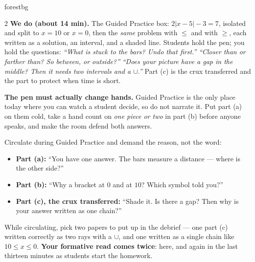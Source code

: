 \documentclass[10pt]{article}
\begin{document}
\begin{skillbox}{forestbg}
\begin{multicols}{2}
\columnbreak
\textbf{We do (about 14 min).} The Guided Practice box: $2|x-5|-3=7$, isolated and split to
$x=10$ or $x=0$, then the \emph{same} problem with $\le$ and with $\ge$, each written as a
solution, an interval, and a shaded line. Students hold the pen; you hold the questions:
\emph{``What is stuck to the bars? Undo that first.''} \quad \emph{``Closer than or farther
than? So between, or outside?''} \quad \emph{``Does your picture have a gap in the middle? Then
it needs two intervals and a $\cup$.''} Part (c) is the crux transferred and the part to protect
when time is short.

\textbf{The pen must actually change hands.} Guided Practice is the only place today where you
can watch a student decide, so do not narrate it. Put part (a) on them cold, take a hand count
on \emph{one piece or two} in part (b) before anyone speaks, and make the room defend both
answers.

Circulate during Guided Practice and demand the reason, not the word:
\begin{itemize}[leftmargin=1.1em, nosep]
  \item \textbf{Part (a):} ``You have one answer. The bars measure a distance --- where is the
        other side?''
  \item \textbf{Part (b):} ``Why a bracket at $0$ and at $10$? Which symbol told you?''
  \item \textbf{Part (c), the crux transferred:} ``Shade it. Is there a gap? Then why is your
        answer written as one chain?''
\end{itemize}
While circulating, pick two papers to put up in the debrief --- one part (c) written correctly
as two rays with a $\cup$, and one written as a single chain like $10\le x\le0$.
\textbf{Your formative read comes twice}: here, and again in the last thirteen minutes as
students start the homework.
\end{multicols}
\end{skillbox}
\end{document}
